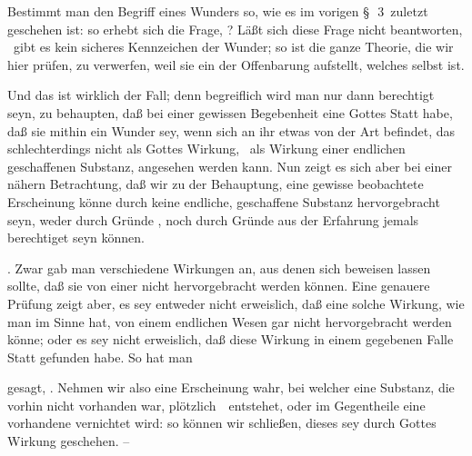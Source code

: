 \begin{aufza}
\item Bestimmt man den Begriff eines Wunders so, wie es im vorigen §~\no\,3\ zuletzt geschehen ist: so erhebt sich die Frage, ? Läßt sich diese Frage nicht beantworten, \dh\ gibt es kein sicheres Kennzeichen der Wunder; so ist die ganze Theorie, die wir hier prüfen, zu verwerfen, weil sie ein  der Offenbarung aufstellt, welches selbst  ist.
\item Und das ist wirklich der Fall; denn begreiflich wird man nur dann berechtigt seyn, zu behaupten, daß bei einer gewissen Begebenheit eine  Gottes Statt habe, daß sie mithin ein Wunder sey, wenn sich an ihr etwas von der Art befindet, das schlechterdings nicht als Gottes  Wirkung, \dh\ als Wirkung einer endlichen geschaffenen Substanz, angesehen werden kann. Nun zeigt es sich aber bei einer nähern Betrachtung, daß wir zu der Behauptung, eine gewisse beobachtete Erscheinung könne durch keine endliche, geschaffene Substanz hervorgebracht seyn, weder durch Gründe , noch durch Gründe aus der Erfahrung jemals berechtiget seyn können.
\item {} . Zwar gab man verschiedene Wirkungen an, aus denen sich  beweisen lassen sollte, daß sie von einer  nicht hervorgebracht werden können. Eine genauere Prüfung zeigt aber, es sey entweder nicht erweislich, daß eine solche Wirkung, wie man im Sinne hat, von einem endlichen Wesen gar nicht hervorgebracht werden könne; oder es sey nicht erweislich, daß diese Wirkung in einem gegebenen Falle Statt gefunden habe. So hat man
\end{aufza}
\begin{aufzb}
\item gesagt, . Nehmen wir also eine Erscheinung wahr, bei welcher eine Substanz, die vorhin nicht vorhanden war, plötzlich~\ entstehet, oder im Gegentheile eine vorhandene vernichtet wird: so können wir schließen, dieses sey durch Gottes  Wirkung geschehen. --
\end{aufzb}\par

